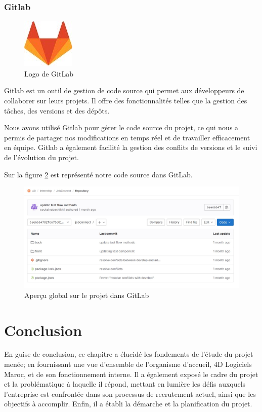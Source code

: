 \subsubsection{Gitlab}

\begin{figure}[h]
    \centering
    \includegraphics[scale=0.7]{Images/gitlab.jpg} %
    \caption{Logo de GitLab\cite{gitlab}}
    \label{fig:gitlab}
\end{figure}


Gitlab est un outil de gestion de code source qui permet aux développeurs de collaborer sur leurs projets. Il offre des fonctionnalités telles que la gestion des tâches, des versions et des dépôts.

Nous avons utilisé Gitlab pour gérer le code source du projet, ce qui nous a permis de partager nos modifications en temps réel et de travailler efficacement en équipe. Gitlab a également facilité la gestion des conflits de versions et le suivi de l'évolution du projet.



Sur la figure \ref{fig:lab} est représenté notre code source dans GitLab.
    \begin{figure}[H]
        \centering
        \includegraphics[scale=0.6]{gitlab/whole2.jpg} %
        \caption{Aperçu global sur le projet dans GitLab}
        \label{fig:lab}
        \end{figure}
\section{Conclusion}
En guise de conclusion, ce chapitre a élucidé les fondements de l’étude du projet
menée; en fournissant une vue d’ensemble de l’organisme d’accueil, 4D Logiciels Maroc,
et de son fonctionnement interne. Il a également exposé le cadre du projet et la problématique à laquelle
il répond, mettant en lumière les défis auxquels l’entreprise est confrontée dans son
processus de recrutement actuel, ainsi que les objectifs à accomplir. Enfin, il a établi la
démarche et la planification du projet.


